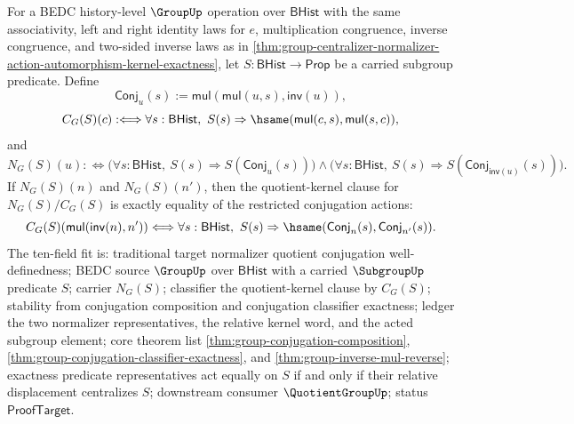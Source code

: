 \begin{theorem}
\label{thm:group-normalizer-quotient-conjugation-well-defined}
For a BEDC history-level $\GroupUp$ operation over $\mathsf{BHist}$ with the
same associativity, left and right identity laws for $e$, multiplication
congruence, inverse congruence, and two-sided inverse laws as in
\autoref{thm:group-centralizer-normalizer-action-automorphism-kernel-exactness},
let $S:\mathsf{BHist}\to\mathsf{Prop}$ be a carried subgroup predicate. Define
$$
\mathsf{Conj}_u(s):=\mathsf{mul}(\mathsf{mul}(u,s),\mathsf{inv}(u)),
$$
$$
C_G(S)(c):\Longleftrightarrow
\forall s:\mathsf{BHist},\ S(s)\Rightarrow
\hsame(\mathsf{mul}(c,s),\mathsf{mul}(s,c)),
$$
and
$$
N_G(S)(u):\Longleftrightarrow
\bigl(\forall s:\mathsf{BHist},\ S(s)\Rightarrow S(\mathsf{Conj}_u(s))\bigr)
\land
\bigl(\forall s:\mathsf{BHist},\ S(s)\Rightarrow
S(\mathsf{Conj}_{\mathsf{inv}(u)}(s))\bigr).
$$
If $N_G(S)(n)$ and $N_G(S)(n')$, then the quotient-kernel clause for
$N_G(S)/C_G(S)$ is exactly equality of the restricted conjugation actions:
$$
C_G(S)(\mathsf{mul}(\mathsf{inv}(n),n'))
\Longleftrightarrow
\forall s:\mathsf{BHist},\ S(s)\Rightarrow
\hsame(\mathsf{Conj}_n(s),\mathsf{Conj}_{n'}(s)).
$$
The ten-field fit is: traditional target normalizer quotient conjugation
well-definedness; BEDC source $\GroupUp$ over $\mathsf{BHist}$ with a carried
$\SubgroupUp$ predicate $S$; carrier $N_G(S)$; classifier the quotient-kernel
clause by $C_G(S)$; stability from conjugation composition and conjugation
classifier exactness; ledger the two normalizer representatives, the relative
kernel word, and the acted subgroup element; core theorem list
\autoref{thm:group-conjugation-composition},
\autoref{thm:group-conjugation-classifier-exactness}, and
\autoref{thm:group-inverse-mul-reverse}; exactness predicate representatives
act equally on $S$ if and only if their relative displacement centralizes $S$;
downstream consumer $\QuotientGroupUp$; status $\mathsf{ProofTarget}$.
\end{theorem}

